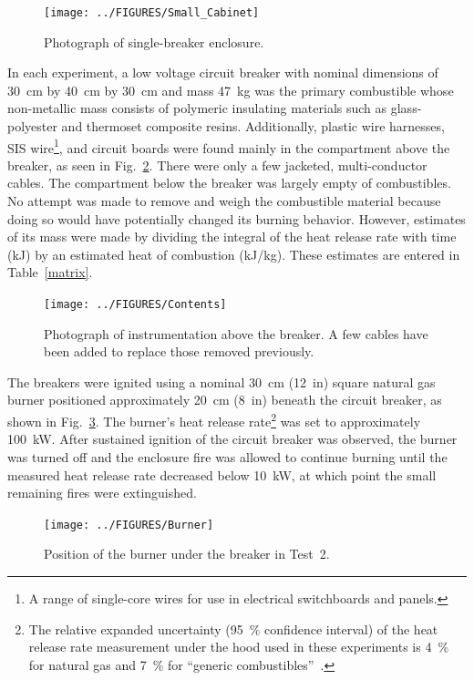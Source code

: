 \documentclass[12pt]{article}
\begin{document}
\begin{figure}[ht]
\centering
\texttt{[image: ../FIGURES/Small\_Cabinet]}
\caption[Photograph of single-breaker enclosure] {Photograph of single-breaker enclosure.}
\label{fig:Cabinet_2}
\end{figure}

In each experiment, a low voltage circuit breaker with nominal dimensions of 30~cm by 40~cm by 30~cm and mass 47~kg was the primary combustible whose non-metallic mass consists of polymeric insulating materials such as glass-polyester and thermoset composite resins. Additionally, plastic wire harnesses, SIS wire\footnote{A range of single-core wires for use in electrical switchboards and panels.}, and circuit boards were found mainly in the compartment above the breaker, as seen in Fig.~\ref{fig:Contents}. There were only a few jacketed, multi-conductor cables. The compartment below the breaker was largely empty of combustibles. No attempt was made to remove and weigh the combustible material because doing so would have potentially changed its burning behavior. However, estimates of its mass were made by dividing the integral of the heat release rate with time (kJ) by an estimated heat of combustion (kJ/kg). These estimates are entered in Table~\ref{matrix}.

\begin{figure}[ht]
\centering
\texttt{[image: ../FIGURES/Contents]}
\caption[Photograph of instrumentation above the breaker] {Photograph of instrumentation above the breaker. A few cables have been added to replace those removed previously.}
\label{fig:Contents}
\end{figure}

The breakers were ignited using a nominal 30~cm (12~in) square natural gas burner positioned approximately 20~cm (8~in) beneath the circuit breaker, as shown in Fig.~\ref{fig:Burner}. The burner's heat release rate\footnote{The relative expanded uncertainty (95~\% confidence interval) of the heat release rate measurement under the hood used in these experiments is 4~\% for natural gas and 7~\% for ``generic combustibles''~\cite{bryant2019nist}.} was set to approximately 100~kW. After sustained ignition of the circuit breaker was observed, the burner was turned off and the enclosure fire was allowed to continue burning until the measured heat release rate decreased below 10~kW, at which point the small remaining fires were extinguished.

\begin{figure}[ht]
\centering
\texttt{[image: ../FIGURES/Burner]}
\caption[Position of the burner] {Position of the burner under the breaker in Test~2.}
\label{fig:Burner}
\end{figure}
\end{document}
